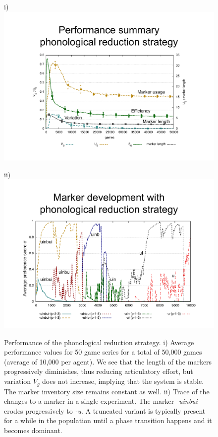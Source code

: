 \begin{figure}
\centerline{i) \includegraphics[scale=.5]{chap12/figs/erosion-performance-summary.pdf}} %
\centerline{ii) \includegraphics[scale=.4]{chap12/figs/uinbui.pdf}} %
  \caption{{Performance of the phonological reduction strategy.} i) Average performance values
for 50 game series for a total of 50,000 games (average of 10,000 per agent). We see that the length of the markers progressively 
diminishes, thus reducing articulatory effort, 
but variation $V_{g}$ does not increase, implying that the system is stable. The marker inventory size remains constant as well.
ii) Trace of the changes to a marker in a single
experiment. The marker {\itshape -uinbui} erodes progressively to {\itshape -u}. A truncated variant is typically present for 
a while in the population until a phase transition happens and it becomes dominant.}
  \label{f:erosion}
\end{figure}

